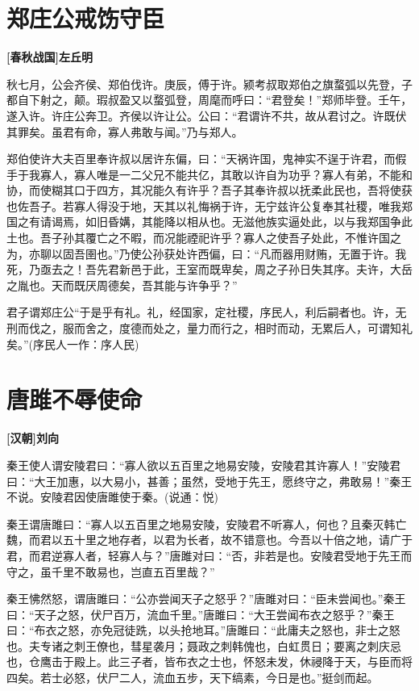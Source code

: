 \documentclass[UTF8,titlepage,oneside]{ctexbook}
\begin{document}
\chapter*{郑庄公戒饬守臣}
\begin{center}
	\textbf{[春秋战国]左丘明}
\end{center}


秋七月，公会齐侯、郑伯伐许。庚辰，傅于许。颍考叔取郑伯之旗蝥弧以先登，子都自下射之，颠。瑕叔盈又以蝥弧登，周麾而呼曰：“君登矣！”郑师毕登。壬午，遂入许。许庄公奔卫。齐侯以许让公。公曰：“君谓许不共，故从君讨之。许既伏其罪矣。虽君有命，寡人弗敢与闻。”乃与郑人。


郑伯使许大夫百里奉许叔以居许东偏，曰：“天祸许国，鬼神实不逞于许君，而假手于我寡人，寡人唯是一二父兄不能共亿，其敢以许自为功乎？寡人有弟，不能和协，而使糊其口于四方，其况能久有许乎？吾子其奉许叔以抚柔此民也，吾将使获也佐吾子。若寡人得没于地，天其以礼悔祸于许，无宁兹许公复奉其社稷，唯我郑国之有请谒焉，如旧昏媾，其能降以相从也。无滋他族实逼处此，以与我郑国争此土也。吾子孙其覆亡之不暇，而况能禋祀许乎？寡人之使吾子处此，不惟许国之为，亦聊以固吾圉也。”乃使公孙获处许西偏，曰：“凡而器用财贿，无置于许。我死，乃亟去之！吾先君新邑于此，王室而既卑矣，周之子孙日失其序。夫许，大岳之胤也。天而既厌周德矣，吾其能与许争乎？”


君子谓郑庄公“于是乎有礼。礼，经国家，定社稷，序民人，利后嗣者也。许，无刑而伐之，服而舍之，度德而处之，量力而行之，相时而动，无累后人，可谓知礼矣。”(序民人一作：序人民)



\chapter*{唐雎不辱使命}
\begin{center}
	\textbf{[汉朝]刘向}
\end{center}


秦王使人谓安陵君曰：“寡人欲以五百里之地易安陵，安陵君其许寡人！”安陵君曰：“大王加惠，以大易小，甚善；虽然，受地于先王，愿终守之，弗敢易！”秦王不说。安陵君因使唐雎使于秦。(说通：悦)


秦王谓唐雎曰：“寡人以五百里之地易安陵，安陵君不听寡人，何也？且秦灭韩亡魏，而君以五十里之地存者，以君为长者，故不错意也。今吾以十倍之地，请广于君，而君逆寡人者，轻寡人与？”唐雎对曰：“否，非若是也。安陵君受地于先王而守之，虽千里不敢易也，岂直五百里哉？”


秦王怫然怒，谓唐雎曰：“公亦尝闻天子之怒乎？”唐雎对曰：“臣未尝闻也。”秦王曰：“天子之怒，伏尸百万，流血千里。”唐雎曰：“大王尝闻布衣之怒乎？”秦王曰：“布衣之怒，亦免冠徒跣，以头抢地耳。”唐雎曰：“此庸夫之怒也，非士之怒也。夫专诸之刺王僚也，彗星袭月；聂政之刺韩傀也，白虹贯日；要离之刺庆忌也，仓鹰击于殿上。此三子者，皆布衣之士也，怀怒未发，休祲降于天，与臣而将四矣。若士必怒，伏尸二人，流血五步，天下缟素，今日是也。”挺剑而起。
\end{document}
